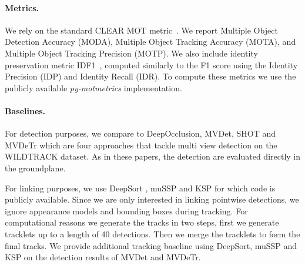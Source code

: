 \documentclass[10pt,twocolumn,letterpaper]{article}
\begin{document}
\paragraph{Metrics.}

We rely on the standard CLEAR MOT metric~\cite{Kasturi09}. We report Multiple Object Detection Accuracy (MODA), Multiple Object Tracking Accuracy (MOTA), and Multiple Object Tracking Precision (MOTP). We also include identity preservation metric IDF1~\cite{Ristani16}, computed similarly to the F1 score using the Identity Precision (IDP) and Identity Recall (IDR). To compute these metrics we use the publicly available \textit{py-motmetrics} implementation.

\paragraph{Baselines.}

For detection purposes, we compare to DeepOcclusion\cite{Chavdarova18a}, MVDet\cite{hou2020multiview}, SHOT\cite{song2021stacked} and MVDeTr\cite{hou2021multiview} which are four approaches that tackle multi view detection on the WILDTRACK dataset. As in these papers, the detection are evaluated directly in the groundplane.

For linking purposes, we use DeepSort \cite{Wojke17}, muSSP \cite{Wang19f} and KSP \cite{Berclaz11} for which code is publicly available. Since we are only interested in linking pointwise detections, we ignore appearance models and bounding boxes during tracking. For computational reasons we generate the tracks in two steps, first we generate tracklets up to a length of 40 detections. Then we merge the tracklets to form the final tracks.
We provide additional tracking baseline using DeepSort, muSSP and KSP on the detection results of MVDet and MVDeTr.
\end{document}
